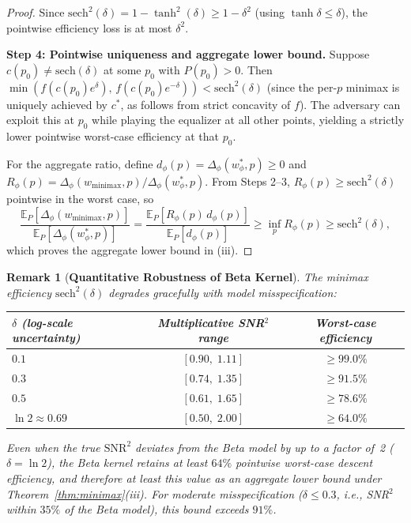 \documentclass{article}
\newtheorem{remark}{Remark}
\begin{document}
\begin{proof}
Since $\mathrm{sech}^2(\delta) = 1 - \tanh^2(\delta) \geq 1 - \delta^2$ (using $\tanh\delta \leq \delta$), the pointwise efficiency loss is at most $\delta^2$.

\textbf{Step 4: Pointwise uniqueness and aggregate lower bound.}
Suppose $c(p_0) \neq \mathrm{sech}(\delta)$ at some $p_0$ with $P(p_0) > 0$. Then $\min(f(c(p_0)e^{\delta}),\, f(c(p_0)e^{-\delta})) < \mathrm{sech}^2(\delta)$ (since the per-$p$ minimax is uniquely achieved by $c^*$, as follows from strict concavity of $f$). The adversary can exploit this at $p_0$ while playing the equalizer at all other points, yielding a strictly lower pointwise worst-case efficiency at that $p_0$.

For the aggregate ratio, define $d_{\phi}(p)=\Delta_{\phi}(w^*_{\phi},p)\ge 0$ and $R_{\phi}(p)=\Delta_{\phi}(w_{\mathrm{minimax}},p)/\Delta_{\phi}(w^*_{\phi},p)$. From Steps 2--3, $R_{\phi}(p)\ge \mathrm{sech}^2(\delta)$ pointwise in the worst case, so
\begin{equation}
\frac{\mathbb{E}_P[\Delta_{\phi}(w_{\mathrm{minimax}},p)]}{\mathbb{E}_P[\Delta_{\phi}(w^*_{\phi},p)]}
= \frac{\mathbb{E}_P[R_{\phi}(p)\,d_{\phi}(p)]}{\mathbb{E}_P[d_{\phi}(p)]}
\ge \inf_p R_{\phi}(p)
\ge \mathrm{sech}^2(\delta),
\end{equation}
which proves the aggregate lower bound in (iii).
\end{proof}

\begin{remark}[\textbf{Quantitative Robustness of Beta Kernel}]
\label{rem:robustness_table}
The minimax efficiency $\mathrm{sech}^2(\delta)$ degrades gracefully with model misspecification:
\begin{center}
\begin{tabular}{@{}lcc@{}}
\toprule
$\delta$ (log-scale uncertainty) & Multiplicative SNR$^2$ range & Worst-case efficiency \\
\midrule
$0.1$ & $[0.90,\; 1.11]$ & $\geq 99.0\%$ \\
$0.3$ & $[0.74,\; 1.35]$ & $\geq 91.5\%$ \\
$0.5$ & $[0.61,\; 1.65]$ & $\geq 78.6\%$ \\
$\ln 2 \approx 0.69$ & $[0.50,\; 2.00]$ & $\geq 64.0\%$ \\
\bottomrule
\end{tabular}
\end{center}
Even when the true $\text{SNR}^2$ deviates from the Beta model by up to a factor of~2 ($\delta = \ln 2$), the Beta kernel retains at least $64\%$ pointwise worst-case descent efficiency, and therefore at least this value as an aggregate lower bound under Theorem~\ref{thm:minimax}(iii). For moderate misspecification ($\delta \leq 0.3$, i.e., SNR$^2$ within $35\%$ of the Beta model), this bound exceeds $91\%$.
\end{remark}
\end{document}

